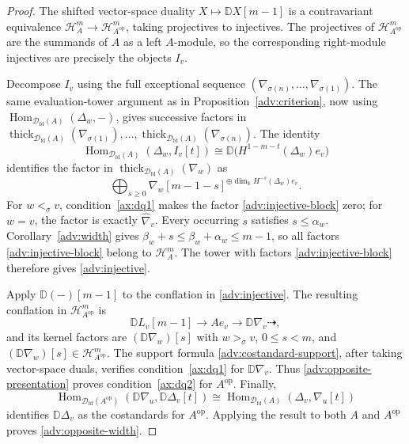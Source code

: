 \documentclass[11pt,a4paper]{article}
\newcommand{\D}{\mathcal D}
\renewcommand{\H}{\mathcal H}
\newcommand{\op}{\mathrm{op}}
\newcommand{\std}{\Delta}
\newcommand{\costd}{\nabla}
\newcommand{\dual}{\mathbb D}
\DeclareMathOperator{\fd}{fd}
\DeclareMathOperator{\Hom}{Hom}
\DeclareMathOperator{\thick}{thick}
\theoremstyle{plain}
\theoremstyle{definition}
\numberwithin{equation}{section}
\begin{document}
\begin{proof}
The shifted vector-space duality
$X\mapsto\dual X[m-1]$ is a contravariant equivalence
$\H_A^m\to\H_{A^{\op}}^m$, taking projectives to injectives.
The projectives of $\H_{A^{\op}}^m$ are the summands of $A$ as a
left $A$-module, so the corresponding right-module injectives are
precisely the objects $I_v$.

Decompose $I_v$ using the full exceptional sequence
$(\costd_{\sigma(n)},\ldots,\costd_{\sigma(1)})$.
The same evaluation-tower argument as in
Proposition~\ref{adv:criterion}, now using
$\Hom_{\D_{\fd}(A)}(\std_w,-)$, gives successive factors in
$\thick_{\D_{\fd}(A)}(\costd_{\sigma(1)}),\ldots,
\thick_{\D_{\fd}(A)}(\costd_{\sigma(n)})$.
The identity
\begin{equation}\label{adv:injective-pairing}
 \Hom_{\D_{\fd}(A)}(\std_w,I_v[t])
 \cong\dual\bigl(H^{1-m-t}(\std_w)e_v\bigr)
\end{equation}
identifies the factor in $\thick_{\D_{\fd}(A)}(\costd_w)$ as
\begin{equation}\label{adv:injective-block}
 \bigoplus_{s\geq0}
 \costd_w[m-1-s]^{\oplus\dim_{\Bbbk}H^{-s}(\std_w)e_v}.
\end{equation}
For $w<_\sigma v$, condition~\ref{ax:dq1} makes the factor
\eqref{adv:injective-block} zero; for $w=v$, the factor is exactly
$\widehat\costd_v$.
Every occurring $s$ satisfies $s\leq\alpha_w$.
Corollary~\ref{adv:width} gives
$\beta_w+s\leq\beta_w+\alpha_w\leq m-1$, so all factors
\eqref{adv:injective-block} belong to $\H_A^m$.
The tower with factors \eqref{adv:injective-block} therefore gives
\eqref{adv:injective}.

Apply $\dual(-)[m-1]$ to the conflation in
\eqref{adv:injective}. The resulting conflation in
$\H_{A^{\op}}^m$ is
\begin{equation}\label{adv:opposite-presentation}
 \dual L_v[m-1]\longrightarrow Ae_v\longrightarrow
 \dual\costd_v\dashrightarrow,
\end{equation}
and its kernel factors are $(\dual\costd_w)[s]$ with
$w>_\sigma v$, $0\leq s<m$, and
$(\dual\costd_w)[s]\in\H_{A^{\op}}^m$.
The support formula \eqref{adv:costandard-support}, after taking
vector-space duals, verifies condition~\ref{ax:dq1} for
$\dual\costd_v$. Thus \eqref{adv:opposite-presentation} proves
condition~\ref{ax:dq2} for $A^{\op}$.
Finally,
\begin{equation}\label{adv:opposite-pairing}
 \Hom_{\D_{\fd}(A^{\op})}(\dual\costd_u,\dual\std_v[t])
 \cong\Hom_{\D_{\fd}(A)}(\std_v,\costd_u[t])
\end{equation}
identifies $\dual\std_v$ as the costandards for $A^{\op}$.
Applying the result to both $A$ and $A^{\op}$ proves
\eqref{adv:opposite-width}.
\end{proof}
\end{document}
